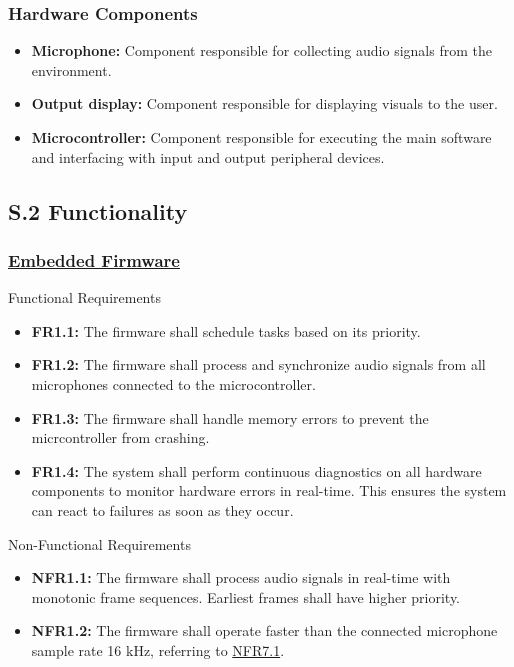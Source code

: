 \documentclass[12pt]{article}
\theoremstyle{definition}
\begin{document}
\subsubsection{Hardware Components}

\begin{itemize}
  \item \textbf{Microphone:}\label{comp:microphone} Component responsible for
  collecting audio signals from the environment.

  \item \textbf{Output display:}\label{comp:display} Component responsible for
  displaying visuals to the user.

  \item \textbf{Microcontroller:} \label{comp:microcontroller} Component
  responsible for executing the main software and interfacing with input and
  output peripheral devices.
\end{itemize}

\subsection{S.2 Functionality} \label{sec:S.2}

\subsubsection{\hyperref[comp:embedded_firmware]{Embedded Firmware}} Functional
Requirements
\begin{itemize}
  \item \label{FR1_1}\textbf{FR1.1:} The firmware shall schedule tasks based on
  its priority.
  
  \item \label{FR1_2}\textbf{FR1.2:} The firmware shall process and synchronize
  audio signals from all microphones connected to the microcontroller.

  \item \label{FR1_3}\textbf{FR1.3:} The firmware shall handle memory errors to
  prevent the micrcontroller from crashing.

  \item \label{FR1_4}\textbf{FR1.4:} The system shall perform continuous
  diagnostics on all hardware components to monitor hardware errors in
  real-time. This ensures the system can react to failures as soon as they
  occur.
\end{itemize}

Non-Functional Requirements
\begin{itemize}
  \item \label{NFR1_1}\textbf{NFR1.1:} The firmware shall process audio signals
  in real-time with monotonic frame sequences. Earliest frames shall have higher
  priority.
  
  \item \label{NFR1_2}\textbf{NFR1.2:} The firmware shall operate faster than
  the connected microphone sample rate 16 kHz, referring to
  \hyperref[NFR7_1]{NFR7.1}.
\end{itemize}
\end{document}
